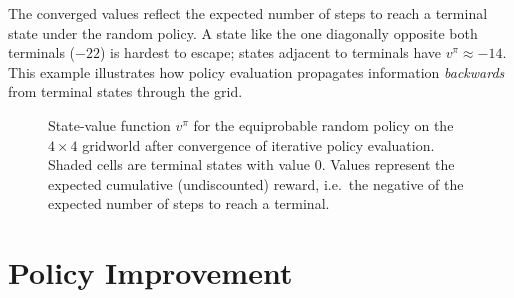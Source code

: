 \begin{example}
\medskip
\noindent
The converged values reflect the expected number of steps to reach a terminal state under the random policy.  A state like the one diagonally opposite both terminals ($-22$) is hardest to escape; states adjacent to terminals have $v^\pi \approx -14$.  This example illustrates how policy evaluation propagates information \emph{backwards} from terminal states through the grid.
\end{example}

\begin{figure}[ht]
\centering
{}
\caption{State-value function $v^\pi$ for the equiprobable random policy on the $4\times 4$ gridworld after convergence of iterative policy evaluation.  Shaded cells are terminal states with value $0$.  Values represent the expected cumulative (undiscounted) reward, i.e.\ the negative of the expected number of steps to reach a terminal.}
\label{fig:gridworld-values}
\end{figure}

\section{Policy Improvement}
\label{sec:policy-improvement}

